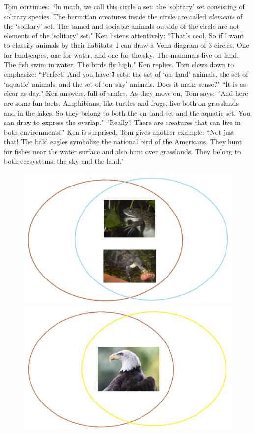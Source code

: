 \begin{multicols}{2}
	Tom continues: ``In math, we call this circle a set: the `solitary' set consisting of solitary species. The hermitian creatures inside the circle are called \textit{elements} of the `solitary' set. The tamed and sociable animals outside of the circle are not elements of the `solitary' set."
	\vskip 0.1cm
	Ken listens attentively: ``That's cool. So if I want to classify animals by their habitats, I can draw a Venn diagram of $3$ circles. One for landscapes, one for water, and one for the sky. The mammals live on land. The fish swim in water. The birds fly high." Ken replies.
	\vskip 0.1cm
	Tom slows down to emphasize: ``Perfect! And you have $3$ sets: the set of `on--land' animals, the set of `aquatic' animals, and the set of `on--sky' animals. Does it make sense?"
	\vskip 0.1cm
	``It is as clear as day." Ken answers, full of smiles.
	\vskip 0.1cm
	As they move on, Tom says: ``And here are some fun facts. Amphibians, like turtles and frogs, live both on grasslands and in the lakes. So they belong to both the on--land set and the aquatic set. You can draw to express the overlap." 
	\vskip 0.1cm
	``Really? There are creatures that can live in both environments!" Ken is surprised.
	\vskip 0.1cm
	Tom gives another example: ``Not just that! The bald eagles symbolize the national bird of the Americans. They hunt for fishes near the water surface and also hunt over grasslands. They belong to both ecosystems: the sky and the land."
	\begin{figure}[H]
		\vspace*{-10pt}
		\centering
		\captionsetup{labelformat= empty, justification=centering}
		\includegraphics[height= 0.3\linewidth]{p2}
		\includegraphics[height= 0.3\linewidth]{p3}
		\vspace*{-25pt}

\end{figure}
\end{multicols}
